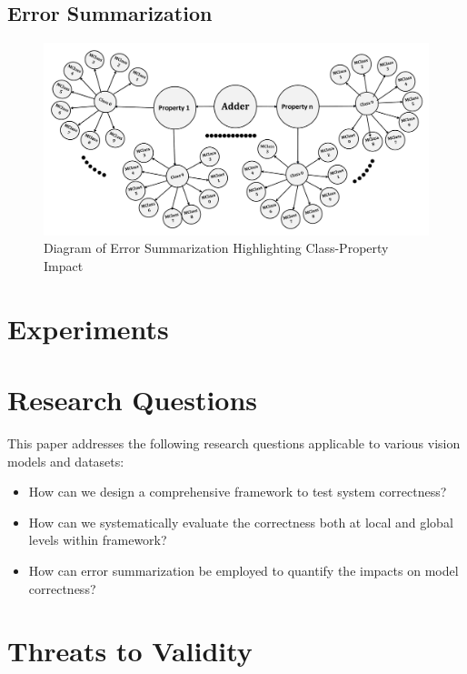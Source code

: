 \documentclass[10pt, conference, a4paper, final]{IEEEtran}
\begin{document}
\subsection{Error Summarization}

\begin{figure}[H]
    \centering
    \includegraphics[width=\linewidth]{paper_images/step5.pdf}
    \caption{Diagram of Error Summarization Highlighting Class-Property Impact}
    \label{fig:error-summarization}
\end{figure}





\section{Experiments}

\section{Research Questions}

This paper addresses the following research questions applicable to various vision models and datasets:

\begin{itemize}
    \item How can we design a comprehensive framework to test system correctness?
    \item How can we systematically evaluate the correctness both at local and global levels within framework?
    \item How can error summarization be employed to quantify the impacts on model correctness?
 
\end{itemize}
\section{Threats to Validity}
\end{document}

